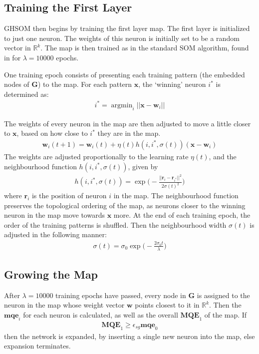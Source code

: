 \documentclass{article}
\DeclareMathOperator*{\argmin}{argmin}
\begin{document}
\subsection{Training the First Layer}
GHSOM then begins by training the first layer map. 
The first layer is initialized to just one neuron. 
The weights of this neuron is initially set to be a random vector in $\mathbb{R}^k$. 
The map is then trained as in the standard SOM algorithm, found in \cite{kohonen1990self} for $\lambda=10000$ epochs.

One training epoch consists of presenting each training pattern (the embedded nodes of $\textbf{G}$) to the map. 
For each pattern $\textbf{x}$, the `winning' neuron $i^*$ is determined as:
\begin{align}
i^* = \argmin_i  ||\textbf{x} - \textbf{w}_i||
\end{align}

The weights of every neuron in the map are then adjusted to move a little closer to $\textbf{x}$, based on how close to $i^*$ they are in the map.
\begin{align}
\textbf{w}_i(t+1) = \textbf{w}_i(t) + \eta(t) h(i, i^*, \sigma(t)) (\textbf{x} - \textbf{w}_i)
\end{align}
The weights are adjusted proportionally to the learning rate $\eta(t)$, and the neighbourhood function $h(i, i^*, \sigma(t))$, given by
\begin{align}
h(i, i^*, \sigma(t)) = \exp\Bigg(-\frac{||\textbf{r}_i-\textbf{r}_{i^*}||^2}{2\sigma(t)^2}\Bigg)
\end{align}
where $\textbf{r}_i$ is the position of neuron $i$ in the map.
The neighbourhood function preserves the topological ordering of the map, as neurons closer to the winning neuron in the map move towards $\textbf{x}$ more.
At the end of each training epoch, the order of the training patterns is shuffled. Then the neighbourhood width $\sigma(t)$ is adjusted in the following manner:
\begin{align}
\sigma(t) = \sigma_0 \exp \Bigg(-\frac{2 \sigma_0 t}{\lambda}\Bigg)
\end{align}




\subsection{Growing the Map}
After $\lambda=10000$ training epochs have passed, every node in $\textbf{G}$ is assigned to the neuron in the map whose weight vector $\textbf{w}$ points closest to it in $\mathbb{R}^k$. 
Then the $\textbf{mqe}_i$ for each neuron is calculated, as well as the overall $\textbf{MQE}_1$ of the map. 
If 
\begin{align}
\textbf{MQE}_1 \geq \epsilon_{sg} \textbf{mqe}_0
\end{align}
then the network is expanded, by inserting a single new neuron into the map, else expansion terminates.
\end{document}
